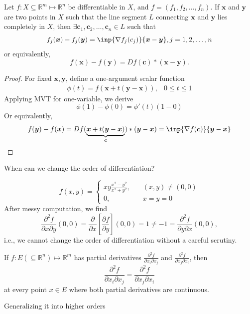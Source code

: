 \begin{theorem}
Let $f:X\subseteq\mathbb{R}^m\mapsto\mathbb{R}^n$ be differentiable in $X$, and $f=(f_1,f_2,\dots,f_n)$. If $\bm x$ and $\bm y$ are two points in $X$ such that the line segment $L$ connecting $\bm x$ and $\bm y$ lies completely in $X$, then $\exists \bm c_1,\bm c_2,\dots,\bm c_n \in L$ such that
\[
f_j(\bm x)-f_j(\bm y)=\inp{\nabla f_j(c_j)}{\bm x-\bm y},j=1,2,\dots,n
\]
or equivalently,
\[
f(\bm x)-f(\bm y)=Df(\bm c)*(\bm x-\bm y).
\]
\end{theorem}
\begin{proof}
For fixed $\bm x,\bm y$, define a one-argument scalar function
\[
\begin{array}{ll}
\phi(t)=f(\bm x+t(\bm y-\bm x)),
&
0\le t\le 1
\end{array}
\]
Applying MVT for one-variable, we derive
\[
\phi(1)-\phi(0)=\phi'(t)(1-0)
\]
Or equivalently,
\[
f(\bm y) - f(\bm x)=Df(\underbrace{\bm x+t(\bm y-\bm x)}_{\bm c})*(\bm y-\bm x)
=\inp{\nabla f(\bm c)}{\bm y-\bm x}
\]
\end{proof}
When can we change the order of differentiation?
\begin{example}
\[
f(x,y)=\left\{
\begin{aligned}
xy\frac{x^2-y^2}{x^2+y^2},&\quad (x,y)\ne(0,0)\\
0,&\quad x=y=0
\end{aligned}
\right.
\]
After messy computation, we find
\[
\frac{\partial^2f}{\partial x\partial y}(0,0)=
\frac{\partial }{\partial x}\left[\frac{\partial f}{\partial y}\right](0,0)=1\ne-1=\frac{\partial^2f}{\partial y\partial x}(0,0),
\]
i.e., we cannot change the order of differentiation without a careful scrutiny. 
\end{example}
\begin{theorem}
If $f:E(\subseteq\mathbb{R}^n)\mapsto\mathbb{R}^m$ has partial derivatives $\frac{\partial^2 f}{\partial x_i\partial x_j}$ and $\frac{\partial^2 f}{\partial x_j\partial x_i}$, then
\[
\frac{\partial^2 f}{\partial x_i\partial x_j}=\frac{\partial^2 f}{\partial x_j\partial x_i}
\]
at every point $x\in E$ where both partial derivatives are continuous.
\end{theorem}
\begin{corollary}
Generalizing it into higher orders
\end{corollary}
